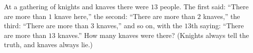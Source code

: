 At a gathering of knights and knaves there were $13$ people. The first said: ``There are more than $1$ knave here,'' the second: ``There are more than $2$ knaves,'' the third: ``There are more than $3$ knaves,'' and so on, with the $13$th saying: ``There are more than $13$ knaves.'' How many knaves were there? (Knights always tell the truth, and knaves always lie.)
